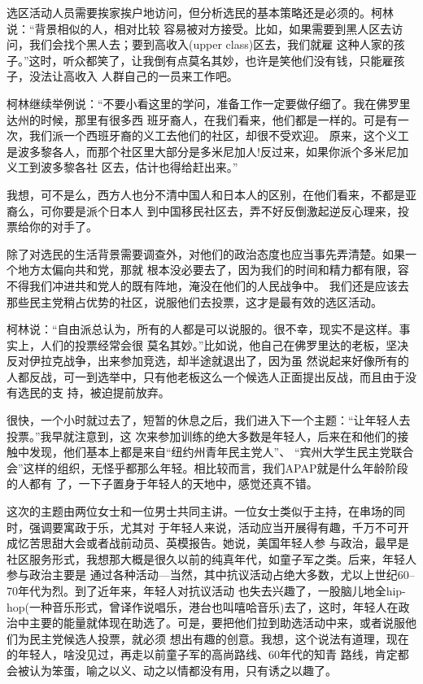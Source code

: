 ﻿\documentclass[11pt]{article}
\begin{document}
选区活动人员需要挨家挨户地访问，但分析选民的基本策略还是必须的。柯林说：``背景相似的人，相对比较
容易被对方接受。比如，如果需要到黑人区去访问，我们会找个黑人去；要到高收入(upper class)区去，我们就雇
这种人家的孩子。''这时，听众都笑了，让我倒有点莫名其妙，也许是笑他们没有钱，只能雇孩子，没法让高收入
人群自己的一员来工作吧。

柯林继续举例说：``不要小看这里的学问，准备工作一定要做仔细了。我在佛罗里达州的时候，那里有很多西
班牙裔人，在我们看来，他们都是一样的。可是有一次，我们派一个西班牙裔的义工去他们的社区，却很不受欢迎。
原来，这个义工是波多黎各人，而那个社区里大部分是多米尼加人!反过来，如果你派个多米尼加义工到波多黎各社
区去，估计也得给赶出来。''

我想，可不是么，西方人也分不清中国人和日本人的区别，在他们看来，不都是亚裔么，可你要是派个日本人
到中国移民社区去，弄不好反倒激起逆反心理来，投票给你的对手了。

除了对选民的生活背景需要调查外，对他们的政治态度也应当事先弄清楚。如果一个地方太偏向共和党，那就
根本没必要去了，因为我们的时间和精力都有限，容不得我们冲进共和党人的既有阵地，淹没在他们的人民战争中。
我们还是应该去那些民主党稍占优势的社区，说服他们去投票，这才是最有效的选区活动。

柯林说：``自由派总认为，所有的人都是可以说服的。很不幸，现实不是这样。事实上，人们的投票经常会很
莫名其妙。''比如说，他自己在佛罗里达的老板，坚决反对伊拉克战争，出来参加竞选，却半途就退出了，因为虽
然说起来好像所有的人都反战，可一到选举中，只有他老板这么一个候选人正面提出反战，而且由于没有选民的支
持，被迫提前放弃。

很快，一个小时就过去了，短暂的休息之后，我们进入下一个主题：``让年轻人去投票。''我早就注意到，这
次来参加训练的绝大多数是年轻人，后来在和他们的接触中发现，他们基本上都是来自``纽约州青年民主党人''、
``宾州大学生民主党联合会''这样的组织，无怪乎都那么年轻。相比较而言，我们APAP就是什么年龄阶段的人都有
了，一下子置身于年轻人的天地中，感觉还真不错。

这次的主题由两位女士和一位男士共同主讲。一位女士类似于主持，在串场的同时，强调要寓政于乐，尤其对
于年轻人来说，活动应当开展得有趣，千万不可开成忆苦思甜大会或者战前动员、英模报告。她说，美国年轻人参
与政治，最早是社区服务形式，我想那大概是很久以前的纯真年代，如童子军之类。后来，年轻人参与政治主要是
通过各种活动---当然，其中抗议活动占绝大多数，尤以上世纪60--70年代为烈。到了近年来，年轻人对抗议活动
也失去兴趣了，一股脑儿地全hip-hop(一种音乐形式，曾译作说唱乐，港台也叫嘻哈音乐)去了，这时，年轻人在政
治中主要的能量就体现在助选了。可是，要把他们拉到助选活动中来，或者说服他们为民主党候选人投票，就必须
想出有趣的创意。我想，这个说法有道理，现在的年轻人，啥没见过，再走以前童子军的高尚路线、60年代的知青
路线，肯定都会被认为笨蛋，喻之以义、动之以情都没有用，只有诱之以趣了。
\end{document}

